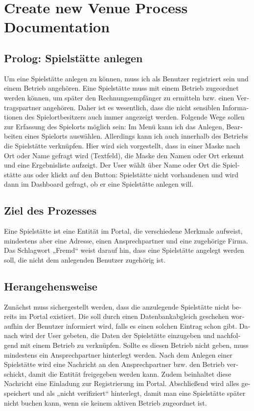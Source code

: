 
\chapter{Create new Venue Process Documentation}
\label{app:B}
\begin{otherlanguage}{german}
\section*{Prolog: Spielstätte anlegen}
Um eine Spielstätte anlegen zu können, muss ich als Benutzer registriert sein und einem Betrieb angehören. Eine Spielstätte muss mit einem Betrieb zugeordnet werden können, um später den Rechnungsempfänger zu ermitteln bzw. einen Vertragspartner angehören. Daher ist es wesentlich, dass die nicht sensiblen Informationen des Spielortbesitzers auch immer angezeigt werden. 
Folgende Wege sollen zur Erfassung des Spielorts möglich sein: Im Menü kann ich das Anlegen, Bearbeiten eines Spielorts auswählen. Allerdings kann ich auch innerhalb des Betriebs die Spielstätte verknüpfen. Hier wird sich vorgestellt, dass in einer Maske nach Ort oder Name gefragt wird (Textfeld), die Maske den Namen oder Ort erkennt und eine Ergebnisliste aufzeigt. Der User wählt über Name oder Ort die Spielstätte aus oder klickt auf den Button: Spielstätte nicht vorhandenen und wird dann im Dashboard gefragt, ob er eine Spielstätte anlegen will.

\section*{Ziel des Prozesses}
Eine Spielstätte ist eine Entität im Portal, die verschiedene Merkmale aufweist, mindestens aber eine Adresse, einen Ansprechpartner und eine zugehörige Firma. Das Schlagwort „Fremd“ weist darauf hin, dass eine Spielstätte angelegt werden soll, die nicht dem anlegenden Benutzer zugehörig ist. 

\section*{Herangehensweise}
Zunächst muss sichergestellt werden, dass die anzulegende Spielstätte nicht bereits im Portal existiert. Die soll durch einen Datenbankabgleich geschehen woraufhin der Benutzer informiert wird, falls es einen solchen Eintrag schon gibt. 
Danach wird der User gebeten, die Daten der Spielstätte einzugeben und nachfolgend mit einem Betrieb zu verknüpfen. Sollte es diesen Betrieb nicht geben, muss mindestens ein Ansprechpartner hinterlegt werden. 
Nach dem Anlegen einer Spielstätte wird eine Nachricht an den Ansprechpartner bzw. den Betrieb verschickt, damit die Entität freigegeben werden kann. Zudem beinhaltet diese Nachricht eine Einladung zur Registrierung im Portal. 
Abschließend wird alles gespeichert und als „nicht verifiziert“ hinterlegt, damit man eine Spielstätte später nicht buchen kann, wenn sie keinem aktiven Betrieb zugeordnet ist. 
\end{otherlanguage}